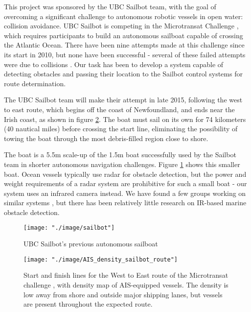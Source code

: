 This project was sponsored by the UBC Sailbot team, with the goal of overcoming a significant challenge to autonomous robotic vessels in open water: collision avoidance. UBC Sailbot is competing in the Microtransat Challenge \cite{transat-history}, which requires participants to build an autonomous sailboat capable of crossing the Atlantic Ocean.  There have been nine attempts made at this challenge since its start in 2010, but none have been successful - several of these failed attempts were due to collisions \cite{transat-history}.  Our task has been to develop a system capable of detecting obstacles and passing their location to the Sailbot control systems for route determination.

The UBC Sailbot team will make their attempt in late 2015, following the west to east route, which begins off the coast of Newfoundland, and ends near the Irish coast, as shown in figure \ref{fig:route_density}. The boat must sail on its own for 74 kilometers (40 nautical miles) before crossing the start line, eliminating the possibility of towing the boat through the most debris-filled region close to shore.

The boat is a 5.5m scale-up of the 1.5m boat successfully used by the Sailbot team in shorter autonomous navigation challenges. Figure \ref{fig:sailbot} shows this smaller boat.  Ocean vessels typically use radar for obstacle detection, but the power and weight requirements of a radar system are prohibitive for such a small boat - our system uses an infrared camera instead. We have found a few groups working on similar systems \cite{ODU-boat-IR-detection}, but there has been relatively little research on IR-based marine obstacle detection.

\begin{figure}
\texttt{[image: "./image/sailbot"]}
\caption[UBC Sailbot.]{\label{fig:sailbot}UBC Sailbot's previous autonomous sailboat \cite{ubc-sailbot__image}}
\end{figure}

\begin{figure}
\centering
\texttt{[image: "./image/AIS\_density\_sailbot\_route"]}
\caption[Microtransat route and vessel density]{\label{fig:route_density}Start and finish lines for the West to East route of the Microtransat challenge \cite{transat__w-e_start-finish}, with density map of AIS-equipped vessels.  The density is low away from shore and outside major shipping lanes, but vessels are present throughout the expected route.}
\end{figure}

